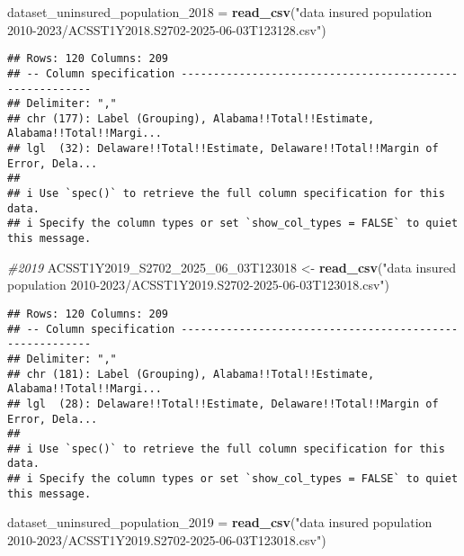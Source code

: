 \documentclass[
]{article}
\newenvironment{Shaded}{\begin{snugshade}}{\end{snugshade}}
\newcommand{\CommentTok}[1]{\textcolor[rgb]{0.56,0.35,0.01}{\textit{#1}}}
\newcommand{\FunctionTok}[1]{\textcolor[rgb]{0.13,0.29,0.53}{\textbf{#1}}}
\newcommand{\NormalTok}[1]{#1}
\newcommand{\OtherTok}[1]{\textcolor[rgb]{0.56,0.35,0.01}{#1}}
\newcommand{\StringTok}[1]{\textcolor[rgb]{0.31,0.60,0.02}{#1}}
\begin{document}
\begin{Shaded}
\begin{Highlighting}[]
\NormalTok{dataset\_uninsured\_population\_2018 }\OtherTok{=} \FunctionTok{read\_csv}\NormalTok{(}\StringTok{"data insured population 2010{-}2023/ACSST1Y2018.S2702{-}2025{-}06{-}03T123128.csv"}\NormalTok{)}
\end{Highlighting}
\end{Shaded}

\begin{verbatim}
## Rows: 120 Columns: 209
## -- Column specification --------------------------------------------------------
## Delimiter: ","
## chr (177): Label (Grouping), Alabama!!Total!!Estimate, Alabama!!Total!!Margi...
## lgl  (32): Delaware!!Total!!Estimate, Delaware!!Total!!Margin of Error, Dela...
## 
## i Use `spec()` to retrieve the full column specification for this data.
## i Specify the column types or set `show_col_types = FALSE` to quiet this message.
\end{verbatim}

\begin{Shaded}
\begin{Highlighting}[]
\CommentTok{\#2019}
\NormalTok{ACSST1Y2019\_S2702\_2025\_06\_03T123018 }\OtherTok{\textless{}{-}} \FunctionTok{read\_csv}\NormalTok{(}\StringTok{"data insured population 2010{-}2023/ACSST1Y2019.S2702{-}2025{-}06{-}03T123018.csv"}\NormalTok{)}
\end{Highlighting}
\end{Shaded}

\begin{verbatim}
## Rows: 120 Columns: 209
## -- Column specification --------------------------------------------------------
## Delimiter: ","
## chr (181): Label (Grouping), Alabama!!Total!!Estimate, Alabama!!Total!!Margi...
## lgl  (28): Delaware!!Total!!Estimate, Delaware!!Total!!Margin of Error, Dela...
## 
## i Use `spec()` to retrieve the full column specification for this data.
## i Specify the column types or set `show_col_types = FALSE` to quiet this message.
\end{verbatim}

\begin{Shaded}
\begin{Highlighting}[]
\NormalTok{dataset\_uninsured\_population\_2019 }\OtherTok{=} \FunctionTok{read\_csv}\NormalTok{(}\StringTok{"data insured population 2010{-}2023/ACSST1Y2019.S2702{-}2025{-}06{-}03T123018.csv"}\NormalTok{)}
\end{Highlighting}
\end{Shaded}
\end{document}
